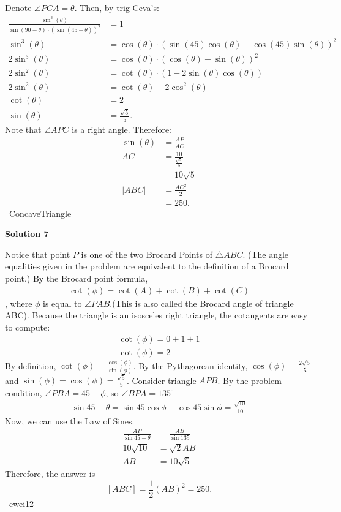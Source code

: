 \begin{enumerate}
Denote $\angle PCA = \theta$. Then, by trig Ceva's: 
 \begin{align*} \frac{\sin^3(\theta)}{\sin(90-\theta) \cdot \left(\sin(45-\theta)\right)^2} &= 1 \\ \sin^3(\theta) &= \cos(\theta) \cdot \left(\sin(45) \cos(\theta) - \cos(45) \sin(\theta)\right)^2 \\ 2\sin^3(\theta) &= \cos(\theta) \cdot \left(\cos(\theta) - \sin(\theta)\right)^2 \\ 2\sin^2(\theta) &= \cot(\theta) \cdot \left(1 - 2\sin(\theta)\cos(\theta)\right) \\ 2\sin^2(\theta) &= \cot(\theta) - 2\cos^2(\theta) \\ \cot(\theta) &= 2 \\ \sin(\theta) &= \frac{\sqrt{5}}{5}. \end{align*}
Note that $\angle APC$ is a right angle. Therefore: 
 \begin{align*} \sin(\theta) &= \frac{AP}{AC} \\ AC &= \frac{10}{\frac{\sqrt{5}}{5}} \\ &= 10\sqrt{5} \\ |ABC| &= \frac{AC^2}{2} \\ &= \boxed{250}. \end{align*}
~ConcaveTriangle

 



\textbf{Solution 7}

Notice that point $P$ is one of the two Brocard Points of $\triangle ABC$. (The angle equalities given in the problem are equivalent to the definition of a Brocard point.) By the Brocard point formula,
 \begin{align*} \cot(\phi) = \cot(A)+\cot(B)+\cot(C)  \end{align*}
, where $\phi$ is equal to $\angle PAB$.(This is also called the Brocard angle of triangle ABC). Because the triangle is an isosceles right triangle, the cotangents are easy to compute:
 \begin{align*}\cot(\phi) = 0 + 1 + 1 \\ \cot(\phi) = 2\end{align*}
By definition, $\cot(\phi) = \frac{\cos(\phi)}{\sin(\phi)}$. By the Pythagorean identity, $\cos(\phi)=\frac{2\sqrt{5}}{5}$ and $\sin(\phi) = \cos(\phi)=\frac{\sqrt{5}}{5}$. Consider triangle $APB$. By the problem condition, $\angle PBA = 45-\phi$, so $\angle BPA = 135^{\circ}$
 \begin{align*}\sin{45-\theta} = \sin{45}\cos{\phi}-\cos{45}\sin{\phi} = \frac{\sqrt{10}}{10}\end{align*}
Now, we can use the Law of Sines.
 \begin{align*} \frac{AP}{\sin{45-\theta}}&=\frac{AB}{\sin{135}} \\ 10 \sqrt{10} &= \sqrt{2} AB \\ AB &= 10 \sqrt{5} \end{align*}
Therefore, the answer is 
 \[[ABC] = \frac{1}{2} (AB)^2 = \boxed{250}.\]~ewei12


\end{enumerate}
